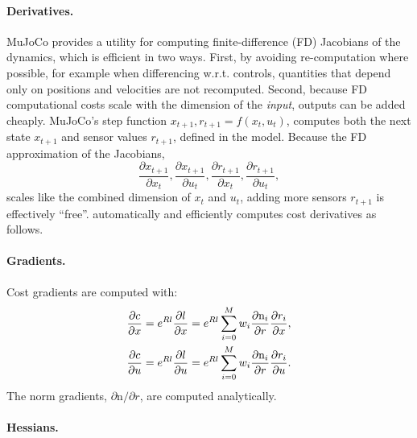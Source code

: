 \paragraph{Derivatives.}
MuJoCo provides a utility for computing finite-difference (FD) Jacobians of the dynamics, which is efficient in two ways. First, by avoiding re-computation where possible, for example when differencing w.r.t. controls, quantities that depend only on positions and velocities are not recomputed. Second, because FD computational costs scale with the dimension of the \emph{input}, outputs can be added cheaply. MuJoCo's step function $x_{t+1}, r_{t+1} = f(x_t, u_t)$, computes both the next state $x_{t+1}$ and sensor values $r_{t+1}$, defined in the model. Because the FD approximation of the Jacobians,
\begin{equation}
	\frac{\partial x_{t+1}}{\partial x_t}, \frac{\partial x_{t+1}}{\partial u_t}, \frac{\partial r_{t+1}}{\partial x_t}, \frac{\partial r_{t+1}}{\partial u_t},
\end{equation}
scales like the combined dimension of $x_t$ and $u_t$, adding more sensors $r_{t+1}$ is effectively ``free''. \app{} automatically and efficiently computes cost derivatives as follows.
\paragraph{Gradients.} Cost gradients are computed with:
\begin{subequations}
	\begin{align}
		\frac{\partial {c}}{\partial {x}} &= e^{R {l}} \frac{\partial {l}}{\partial {x}}=e^{R {l}}\sum \limits_{i = 0}^M w_i \frac{\partial \text{n}_i}{\partial r} \frac{\partial r_i}{\partial {x}}, \\
		\frac{\partial {c}}{\partial {u}} &= e^{R {l}} \frac{\partial {l}}{\partial {u}} = e^{R {l}}\sum \limits_{i = 0}^M w_i \frac{\partial \text{n}_i}{\partial r} \frac{\partial r_i}{\partial {u}}.
	\end{align}
\end{subequations}
The norm gradients, $\partial \text{n} / \partial r$, are computed analytically.

\paragraph{Hessians.}

